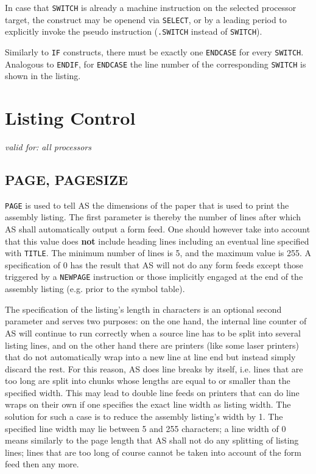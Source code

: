 \documentclass[12pt,twoside]{report}
\makeatletter
\newcommand{\bb}[1]{{\bf #1}}
\newcommand{\tty}[1]{{\tt #1}}
\newcommand{\ttindex}[1]{\index{#1@{\tt #1}}}
\newcommand{\asname}{{AS}}
\makeatother
\begin{document}
In case that \tty{SWITCH} is already a machine instruction on the
selected processor target, the  construct may be openend via \tty{SELECT},
or by a leading period to explicitly invoke the pseudo instruction
(\tty{.SWITCH} instead of \tty{SWITCH}).

Similarly to {\tt IF} constructs, there must be exactly one {\tt ENDCASE}
for every {\tt SWITCH}.  Analogous to {\tt ENDIF}, for {\tt ENDCASE} the
line number of the corresponding {\tt SWITCH} is shown in the listing.


\section{Listing Control}

{\em valid for: all processors}


\subsection{PAGE, PAGESIZE}
\label{SectPAGE}
\ttindex{PAGE}\ttindex{.PAGE}\ttindex{PAGESIZE}

\tty{PAGE} is used to tell \asname{} the dimensions of the paper that is used to
print the assembly listing.  The first parameter is thereby the
number of lines after which \asname{} shall automatically output a form
feed.  One should however take into account that this value does \bb{not}
include heading lines including an eventual line specified with
\tty{TITLE}.  The minimum number of lines is 5, and the maximum value is
255.  A specification of 0 has the result that \asname{} will not do any form
feeds except those triggered by a \tty{NEWPAGE} instruction or those
implicitly engaged at the end of the assembly listing (e.g. prior to the
symbol table).

The specification of the listing's length in characters is an
optional second parameter and serves two purposes: on the one hand,
the internal line counter of \asname{} will continue to run correctly when a
source line has to be split into several listing lines, and on
the other hand there are printers (like some laser printers) that do
not automatically wrap into a new line at line end but instead simply
discard the rest.  For this reason, \asname{} does line breaks by itself,
i.e. lines that are too long are split into chunks whose lengths are
equal to or smaller than the specified width.  This may lead to
double line feeds on printers that can do line wraps on their own if
one specifies the exact line width as listing width.  The solution
for such a case is to reduce the assembly listing's width by 1.  The
specified line width may lie between 5 and 255 characters; a line
width of 0 means similarly to the page length that \asname{} shall not do
any splitting of listing lines; lines that are too long of course
cannot be taken into account of the form feed then any more.
\end{document}
